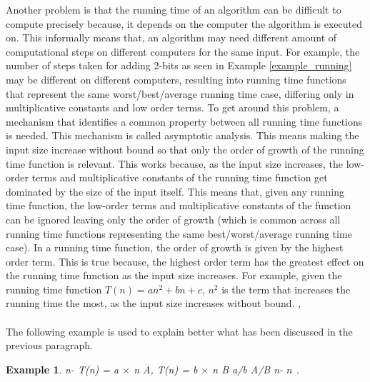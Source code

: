 \documentclass[12pt]{article}
\newtheorem{example}[definition]{Example}
\numberwithin{equation}{subsection}
\numberwithin{table}{subsection}
\numberwithin{algorithm}{subsection}
\numberwithin{figure}{subsection}
\begin{document}
Another problem is that the running time of an algorithm can be difficult to compute precisely because, it depends on the computer the algorithm is executed on. This informally means that, an algorithm may need different amount of computational steps on different computers for the same input. For example, the number of steps taken for adding 2-bits as seen in Example \ref{example_running} may be different on different computers, resulting into running time functions that represent the same worst/best/average running time case, differing only in multiplicative constants and low order terms. To get around this problem, a mechanism that identifies a common property between all running time functions is needed. This mechanism is called asymptotic analysis. This means making the input size increase without bound so that only the order of growth of the running time function is relevant. This works because, as the input size increases, the low-order terms and multiplicative constants of the running time function get dominated by the size of the input itself. This means that, given any running time function, the low-order terms and multiplicative constants of the function can be ignored leaving only the order of growth (which is common across all running time functions representing the same best/worst/average running time case). In a running time function, the order of growth is given by the highest order term. This is true because, the highest order term has the greatest effect on the running time function as the input size increases. For example, given the running time function $\mathit{T(n) = an^2+bn+c}$, $\mathit{n^2}$ is the term that increases the running time the most, as the input size increases without bound. \cite{cormen_leiserson_rivest_stein}, \cite{adamchik_2009} \\\\
The following example is used to explain better what has been discussed in the previous paragraph.
\begin{example}
{} n-{} T(n) = a $\times$ n {} A, {} T(n) = b $\times$ n {} B {} a/b {} A/B {} n-{} $n$ {}. {}
\end{example}
\end{document}
